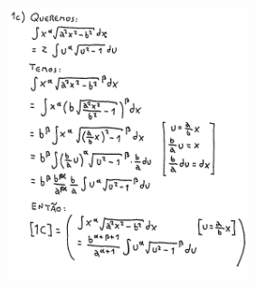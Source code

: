 \documentclass[oneside,12pt]{article}
\begin{document}
\includegraphics[height=8cm]{2020-2-C2/20210502_C2_P2_1c.pdf}
\end{document}

